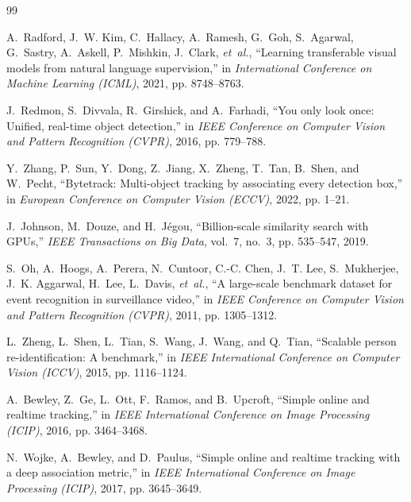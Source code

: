 \documentclass[12pt,a4paper]{article}
\begin{document}
\begin{thebibliography}{99}
\fontsize{11pt}{13pt}\selectfont

A.~Radford, J.~W. Kim, C.~Hallacy, A.~Ramesh, G.~Goh, S.~Agarwal, G.~Sastry, A.~Askell, P.~Mishkin, J.~Clark, \emph{et~al.}, ``Learning transferable visual models from natural language supervision,'' in \emph{International Conference on Machine Learning (ICML)}, 2021, pp. 8748--8763.

J.~Redmon, S.~Divvala, R.~Girshick, and A.~Farhadi, ``You only look once: Unified, real-time object detection,'' in \emph{IEEE Conference on Computer Vision and Pattern Recognition (CVPR)}, 2016, pp. 779--788.

Y.~Zhang, P.~Sun, Y.~Dong, Z.~Jiang, X.~Zheng, T.~Tan, B.~Shen, and W.~Pecht, ``Bytetrack: Multi-object tracking by associating every detection box,'' in \emph{European Conference on Computer Vision (ECCV)}, 2022, pp. 1--21.

J.~Johnson, M.~Douze, and H.~J{\'e}gou, ``Billion-scale similarity search with GPUs,'' \emph{IEEE Transactions on Big Data}, vol.~7, no.~3, pp. 535--547, 2019.

S.~Oh, A.~Hoogs, A.~Perera, N.~Cuntoor, C.-C. Chen, J.~T. Lee, S.~Mukherjee, J.~K. Aggarwal, H.~Lee, L.~Davis, \emph{et~al.}, ``A large-scale benchmark dataset for event recognition in surveillance video,'' in \emph{IEEE Conference on Computer Vision and Pattern Recognition (CVPR)}, 2011, pp. 1305--1312.

L.~Zheng, L.~Shen, L.~Tian, S.~Wang, J.~Wang, and Q.~Tian, ``Scalable person re-identification: A benchmark,'' in \emph{IEEE International Conference on Computer Vision (ICCV)}, 2015, pp. 1116--1124.

A.~Bewley, Z.~Ge, L.~Ott, F.~Ramos, and B.~Upcroft, ``Simple online and realtime tracking,'' in \emph{IEEE International Conference on Image Processing (ICIP)}, 2016, pp. 3464--3468.

N.~Wojke, A.~Bewley, and D.~Paulus, ``Simple online and realtime tracking with a deep association metric,'' in \emph{IEEE International Conference on Image Processing (ICIP)}, 2017, pp. 3645--3649.

\end{thebibliography}
\end{document}
